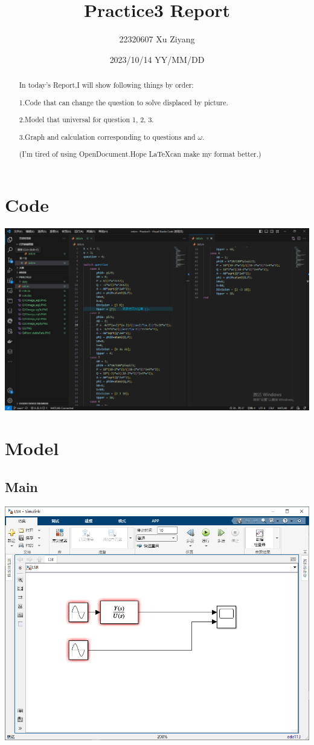 \documentclass[12pt,a4paper,oneside]{ctexart}
\title{\textbf{Practice3 Report}}
\author{22320607 Xu Ziyang}
\date{2023/10/14 YY/MM/DD}
\begin{document}
    \maketitle
\begin{abstract}
    In today's Report,I will show following things by order:

    1.Code that can change the question to solve displaced by picture.

    2.Model that universal for question 1, 2, 3.

    3.Graph and calculation corresponding to questions and $\omega$.

    (I'm tired of using OpenDocument.Hope \LaTeX \space can make my format better.)
\end{abstract}
\newpage
\tableofcontents 
\newpage
\section{Code}
    \includegraphics[width = 0.9\linewidth]{Code}

\newpage
\section{Model}
    \subsection*{Main}
        \includegraphics[width = 0.9\linewidth]{Model}
\end{document}
